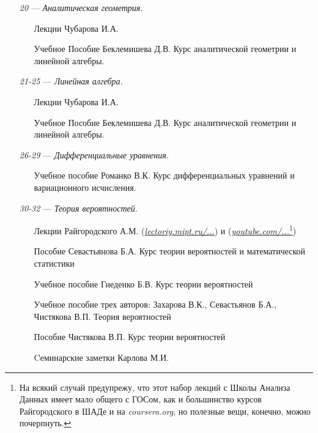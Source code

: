 \begin{itemize}
\item[\textit{20}]
\; --- \: \textit{Аналитическая геометрия.}
\begin{itemize}
\item[\textbullet]
Лекции Чубарова И.А. 
\item[\textbullet]
Учебное Пособие Беклемишева Д.В. \glqq Курс аналитической геометрии и линейной алгебры\grqq.
\end{itemize}

\item[\textit{21-25}] 
\; --- \: \textit{Линейная алгебра.}
\begin{itemize}
\item[\textbullet]
Лекции Чубарова И.А. 
\item[\textbullet]
Учебное Пособие Беклемишева Д.В. \glqq Курс аналитической геометрии и линейной алгебры\grqq.
\end{itemize}

\item[\textit{26-29}] 
\; --- \: \textit{Дифференциальные уравнения.}
\begin{itemize}
\item[\textbullet] 
Учебное пособие Романко В.К. \glqq Курс дифференциальных уравнений и вариационного исчисления\grqq.
\end{itemize}

\item[\textit{30-32}]
\; --- \: \textit{Теория вероятностей.}
\begin{itemize}
\item[\textbullet]
Лекции Райгородского А.М. (\href{http://lectoriy.mipt.ru/course/Maths-ProbabilityTheoryBasics-L15}{\textit{lectoriy.mipt.ru/...}}) и (\href{https://www.youtube.com/playlist?list=PLJOzdkh8T5kouOIbZDCqzB72hBn9T7gsJ}{\textit{youtube.com/...}\footnote{На всякий случай предупрежу, что этот набор лекций с Школы Анализа Данных имеет мало общего с ГОСом, как и большинство курсов Райгородского в ШАДе и на \href{https://www.coursera.org}{\textit{coursera.org}}, но полезные вещи, конечно, можно почерпнуть.}})
\item[\textbullet]
Пособие Севастьянова Б.А. \glqq Курс теории вероятностей и математической статистики\grqq
\item[\textbullet]
Учебное пособие Гнеденко Б.В. \glqq Курс теории вероятностей\grqq
\item [\textbullet]
Учебное пособие трех авторов: Захарова В.К., Севастьянов Б.А., Чистякова В.П. \glqq Теория вероятностей\grqq
\item[\textbullet]
Пособие Чистякова В.П. \glqq Курс теории вероятностей\grqq
\item[\textbullet]
Cеминарские заметки Карлова М.И.
\end{itemize}


\end{itemize}
